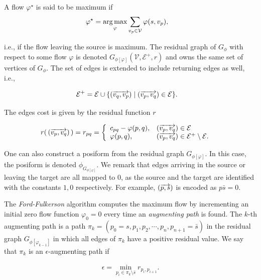 A flow $\varphi ^{\star}$ is said to be maximum if 
\begin{align*}
	\varphi ^{\star} &= \operatorname*{arg\,max}_{\varphi} \sum_{v_p \in \mathcal{V}}{\varphi(s,v_p)},
\end{align*}

i.e., if the flow leaving the source is maximum. The residual graph of $G_{\phi}$ with respect to some flow $\varphi$ is denoted $G_{ \phi [ \varphi ] }(\mathcal{V},\mathcal{E}^+,r)$ and owns the same set of vertices of $G_{\phi}$. The set of edges is extended to include returning edges as well, i.e.,

\begin{align*}
	\mathcal{E}^+ &= \mathcal{E} \cup \{ ( \overrightarrow{ v_q,v_p} ) \; | \; ( \overrightarrow{ v_p,v_q} ) \in \mathcal{E} \}.
\end{align*}

The edges cost is given by the residual function $r$

\begin{align*}
	r(\, ( \overrightarrow{ v_p,v_q} ) \, ) = r_{pq} &= \left\{ \begin{array}{ll}
	c_{pq} - \varphi( p,q ), & ( \overrightarrow{ v_p,v_q} ) \in \mathcal{E}\\
	\varphi( p,q ), & ( \overrightarrow{ v_p,v_q} ) \in \mathcal{E}^+ \setminus \mathcal{E}.
\end{array}\right.	 
\end{align*}

One can also construct a posiform from the residual graph $G_{ \phi [ \varphi ] }$. In this case, the posiform is denoted $\phi_{G_{ \phi [ \varphi ] }}$. We remark that edges arriving in the source or leaving the target are all mapped to $0$, as the source and the target are identified with the constants $1,0$ respectively. For example, $( \overrightarrow{ p,s} )$ is encoded as $p\bar{s}=0$.

The \emph{Ford-Fulkerson} algorithm computes the maximum flow by incrementing an initial zero flow function $\varphi_0=0$ every time an \emph{augmenting path} is found. The $k$-th augmenting path is a path $\pi_k = (p_0=s,p_1,p_2,\cdots,p_n,p_{n+1}=\bar{s})$ in the residual graph $G_{ \phi [\varphi_{k-1}] }$ in which all edges of $\pi_k$ have a positive residual value. We say that $\pi_k$ is an $\epsilon$-augmenting path if 

\begin{align*}
	\epsilon = \min_{p_i \in \pi_k\setminus {\bar{s}}} r_{p_i,p_{i+1}}.
\end{align*}

